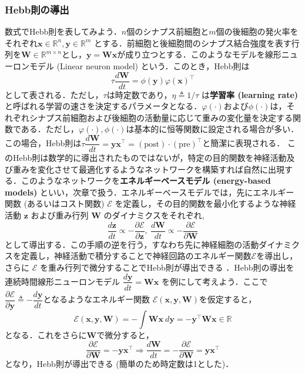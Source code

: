 \subsubsection{Hebb則の導出}
数式でHebb則を表してみよう．$n$個のシナプス前細胞と$m$個の後細胞の発火率をそれぞれ$\mathbf{x}\in \mathbb{R}^n, \mathbf{y}\in \mathbb{R}^m$ とする．前細胞と後細胞間のシナプス結合強度を表す行列を$\mathbf{W}\in \mathbb{R}^{m\times n}$とし，$\mathbf{y}=\mathbf{W}\mathbf{x}$が成り立つとする．このようなモデルを線形ニューロンモデル (Linear neuron model) という．このとき，Hebb則は
\begin{equation}
\tau\frac{d\mathbf{W}}{dt}=\phi(\mathbf{y})\varphi(\mathbf{x})^\top
\end{equation}
として表される．ただし，$\tau$は時定数であり，$\eta\triangleq1/\tau$ は\textbf{学習率 (learning rate)} と呼ばれる学習の速さを決定するパラメータとなる．$\varphi(\cdot)$および$\phi(\cdot)$は，それぞれシナプス前細胞および後細胞の活動量に応じて重みの変化量を決定する関数である．ただし，$\varphi(\cdot), \phi(\cdot)$は基本的に恒等関数に設定される場合が多い．この場合，Hebb則は$
\tau\dfrac{d\mathbf{W}}{dt}=\mathbf{y}\mathbf{x}^\top=(\text{post})\cdot (\text{pre})^\top
$と簡潔に表現される．
このHebb則は数学的に導出されたものではないが，特定の目的関数を神経活動及び重みを変化させて最適化するようなネットワークを構築すれば自然に出現する．このようなネットワークを\textbf{エネルギーベースモデル (energy-based models)} といい，次章で扱う．エネルギーベースモデルでは，先にエネルギー関数 (あるいはコスト関数) $\mathcal{E}$ を定義し，その目的関数を最小化するような神経活動 $\mathbf{z}$ および重み行列 $\mathbf{W}$ のダイナミクスをそれぞれ,
\begin{equation}
\frac{d \mathbf{z}}{dt}\propto-\frac{\partial \mathcal{E}}{\partial \mathbf{z}},\ \frac{d \mathbf{W}}{dt}\propto-\frac{\partial \mathcal{E}}{\partial \mathbf{W}}
\end{equation}
として導出する．この手順の逆を行う，すなわち先に神経細胞の活動ダイナミクスを定義し，神経活動で積分することで神経回路のエネルギー関数$\mathcal{E}$を導出し，さらに $\mathcal{E}$ を重み行列で微分することでHebb則が導出できる \citep{Isomura2020-sn}．Hebb則の導出を連続時間線形ニューロンモデル $\dfrac{d\mathbf{y}}{dt}=\mathbf{W}\mathbf{x}$ を例にして考えよう．ここで$\dfrac{\partial\mathcal{E}}{\partial\mathbf{y}}\triangleq-\dfrac{d\mathbf{y}}{dt}$となるようなエネルギー関数 $\mathcal{E}(\mathbf{x}, \mathbf{y}, \mathbf{W})$を仮定すると，
\begin{equation}
\mathcal{E}(\mathbf{x}, \mathbf{y}, \mathbf{W})=-\int \mathbf{W}\mathbf{x}\ d\mathbf{y}=-\mathbf{y}^\top \mathbf{W}\mathbf{x} \in \mathbb{R}
\end{equation}
となる．これをさらに$\mathbf{W}$で微分すると，
\begin{equation}
\dfrac{\partial\mathcal{E}}{\partial\mathbf{W}}=-\mathbf{y}\mathbf{x}^\top\Rightarrow
\frac{d\mathbf{W}}{dt}=-\dfrac{\partial\mathcal{E}}{\partial\mathbf{W}}=\mathbf{y}\mathbf{x}^\top
\end{equation}
となり，Hebb則が導出できる (簡単のため時定数は1とした)．
